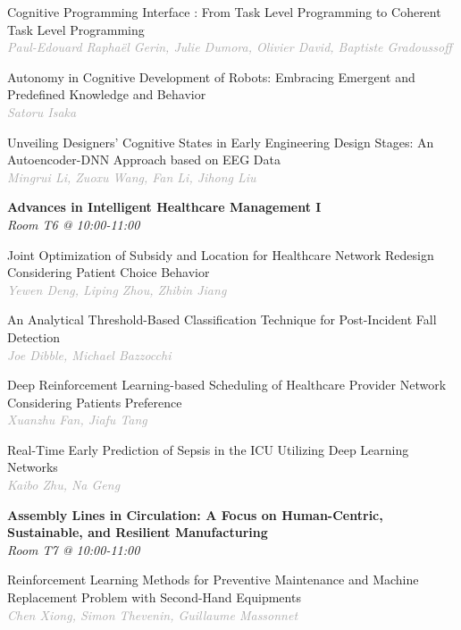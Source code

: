 \begin{multicols*}{2}
\small Cognitive Programming Interface : From Task Level Programming to Coherent Task Level Programming\\ 
\footnotesize \textcolor{darkgray}{\textit{Paul-Edouard Raphaël Gerin, Julie  Dumora, Olivier  David, Baptiste  Gradoussoff}}

\small Autonomy in Cognitive Development of Robots: Embracing Emergent and Predefined Knowledge and Behavior\\ 
\footnotesize \textcolor{darkgray}{\textit{Satoru Isaka}}

\small Unveiling Designers' Cognitive States in Early Engineering Design Stages: An Autoencoder-DNN Approach based on EEG Data\\ 
\footnotesize \textcolor{darkgray}{\textit{Mingrui Li, Zuoxu  Wang, Fan  Li, Jihong  Liu}}

\normalsize \textbf{Advances in Intelligent Healthcare Management I}\\
\small \textit{Room T6 @ 10:00-11:00}

\small Joint Optimization of Subsidy and Location for Healthcare Network Redesign Considering Patient Choice Behavior\\ 
\footnotesize \textcolor{darkgray}{\textit{Yewen Deng, Liping  Zhou, Zhibin  Jiang}}

\small An Analytical Threshold-Based Classification Technique for Post-Incident Fall Detection\\ 
\footnotesize \textcolor{darkgray}{\textit{Joe Dibble, Michael  Bazzocchi}}

\small Deep Reinforcement Learning-based Scheduling of Healthcare Provider Network Considering Patients Preference\\ 
\footnotesize \textcolor{darkgray}{\textit{Xuanzhu Fan, Jiafu  Tang}}

\small Real-Time Early Prediction of Sepsis in the ICU Utilizing Deep Learning Networks\\ 
\footnotesize \textcolor{darkgray}{\textit{Kaibo Zhu, Na  Geng}}

\normalsize \textbf{Assembly Lines in Circulation: A Focus on Human-Centric, Sustainable, and Resilient Manufacturing}\\
\small \textit{Room T7 @ 10:00-11:00}

\small Reinforcement Learning Methods for Preventive Maintenance and Machine Replacement Problem with Second-Hand Equipments\\ 
\footnotesize \textcolor{darkgray}{\textit{Chen Xiong, Simon  Thevenin, Guillaume  Massonnet}}


\end{multicols*}

